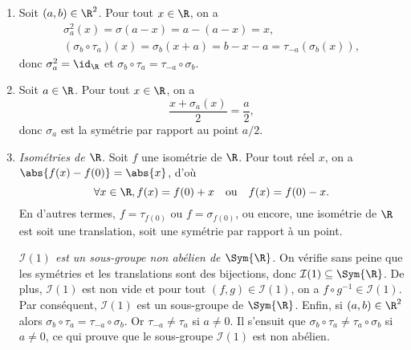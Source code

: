 \begin{enumerate}
  \item %
    Soit $(a,b)\in\R^2$. 
    Pour tout $x\in\R$, on a
    \begin{gather*}
      \sigma_a^2(x) = \sigma(a - x) = a - (a - x) = x, \\
      (\sigma_b\circ \tau_a)(x) = \sigma_b(x + a) = b - x - a = \tau_{-a}(\sigma_b(x)), 
    \end{gather*}
    donc $\sigma_a^2 = \id_\R$ et $\sigma_b\circ \tau_a = \tau_{-a}\circ \sigma_b$.

  \item %
    Soit $a\in\R$.
    Pour tout $x\in\R$, on a
    \[
      \frac{x + \sigma_a(x)}{2} = \frac{a}{2},
    \]
    donc $\sigma_a$ est la symétrie par rapport au point $a/2$.

  \item %
    \emph{Isométries de $\R$.}
    Soit $f$ une isométrie de $\R$.
    Pour tout réel $x$, on a $\abs{f(x) - f(0)} = \abs{x}$, d'où
    \[
      \forall x\in\R, f(x) = f(0) + x \quad\text{ou}\quad f(x) = f(0) - x.
    \]
    En d'autres termes, $f = \tau_{f(0)}$ ou $f = \sigma_{f(0)}$, ou encore, une isométrie de $\R$ est soit une translation, soit une symétrie par rapport à un point.

    \emph{$\mathcal{I}(1)$ est un sous-groupe non abélien de $\Sym{\R}$.}
    On vérifie sans peine que les symétries et les translations sont des bijections, donc $\mathcal{I}(1)\subseteq\Sym{\R}$.
    De plus, $\mathcal{I}(1)$ est non vide et pour tout $(f,g)\in\mathcal{I}(1)$, on a $f\circ g^{-1}\in\mathcal{I}(1)$.
    Par conséquent, $\mathcal{I}(1)$ est un sous-groupe de $\Sym{\R}$.
    Enfin, si $(a,b)\in\R^2$ alors $\sigma_b\circ\tau_a = \tau_{-a}\circ\sigma_b$.
    Or $\tau_{-a}\neq \tau_a$ si $a\neq 0$.
    Il s'ensuit que $\sigma_b\circ\tau_a \neq \tau_a\circ\sigma_b$ si $a\neq 0$, ce qui prouve que le sous-groupe $\mathcal{I}(1)$ est non abélien.


\end{enumerate}

